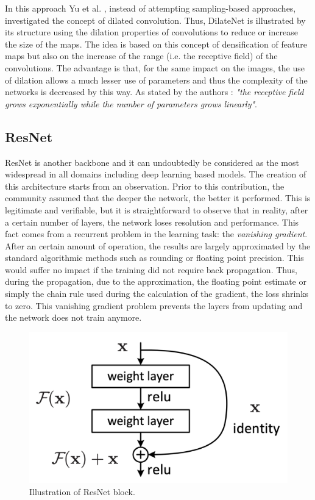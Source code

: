 In this approach Yu et al. \cite{yu2015multi}, instead of attempting sampling-based approaches, investigated the concept of dilated convolution. Thus, DilateNet is illustrated by its structure using the dilation properties of convolutions to reduce or increase the size of the maps. The idea is based on this concept of densification of feature maps but also on the increase of the range (i.e. the receptive field) of the convolutions. The advantage is that, for the same impact on the images, the use of dilation allows a much lesser use of parameters and thus the complexity of the networks is decreased by this way. As stated by the authors : \emph{"the receptive field grows exponentially while the number of parameters grows linearly"}.


\subsection{ResNet}\label{seg3}

ResNet \cite{he2016deep} is another backbone and it can undoubtedly be considered as the most widespread in all domains including deep learning based models. The creation of this architecture starts from an observation. Prior to this contribution, the community assumed that the deeper the network, the better it performed. This is legitimate and verifiable, but it is straightforward to observe that in reality, after a certain number of layers, the network loses resolution and performance. This fact comes from a recurrent problem in the learning task: the \emph{vanishing gradient}. After an certain amount of operation, the results are largely approximated by the standard algorithmic methods such as rounding or floating point precision. This would suffer no impact if the training did not require back propagation. Thus, during the propagation, due to the approximation, the floating point estimate \cite{gysel2016hardware} or simply the chain rule \cite{leibniz} used during the calculation of the gradient, the loss shrinks to zero. This vanishing gradient problem prevents the layers from updating and the network does not train anymore.

\begin{figure}[h]
	\centering
	\includegraphics[width=0.6\linewidth]{Figures/SOA/resnetblock}
	\caption[Illustration of ResNet block.]{Illustration of ResNet \cite{he2016deep} block.}
	\label{fig:resnetblock}
\end{figure}


